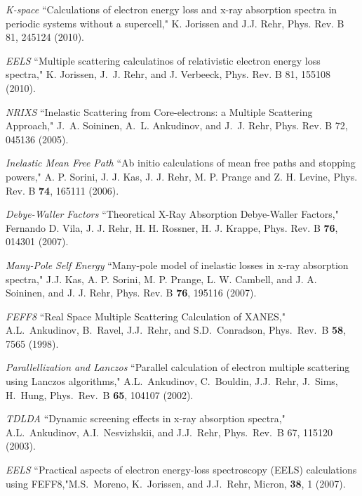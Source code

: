 \documentclass[11pt,oneside]{report} %
\begin{document}
\begin{latexonly}
\begin{Reflist}
\item [\textit{K-space}]  ``Calculations of electron energy loss and x-ray absorption spectra in periodic systems without
a supercell," K. Jorissen and J.J. Rehr, Phys. Rev. B 81, 245124 (2010).

\item [\textit{EELS}] ``Multiple scattering calculatinos of relativistic electron
energy loss spectra," K. Jorissen, J.~J. Rehr, and J. Verbeeck,
 Phys. Rev. B 81, 155108 (2010).

\item [\textit{NRIXS}] ``Inelastic Scattering from Core-electrons: a Multiple Scattering
Approach," J.~A. Soininen, A.~L. Ankudinov, and J.~J. Rehr,
Phys. Rev. B 72, 045136 (2005).

\item [\textit{Inelastic Mean Free Path}]  ``Ab initio calculations of mean free paths and stopping powers,"
A. P. Sorini, J. J. Kas, J. J. Rehr, M. P. Prange and Z. H. Levine,
Phys. Rev. B {\bf 74}, 165111 (2006).

\item [\textit{Debye-Waller Factors}] ``Theoretical X-Ray Absorption Debye-Waller Factors,"
Fernando D. Vila, J. J. Rehr, H. H. Rossner, H. J. Krappe,
Phys. Rev. B {\bf76}, 014301 (2007).

\item [\textit{Many-Pole Self Energy}]  ``Many-pole model of inelastic losses in x-ray absorption spectra,"
J.J. Kas, A. P. Sorini, M. P. Prange, L. W. Cambell, and J. A. Soininen,
and J. J. Rehr, Phys. Rev. B {\bf 76}, 195116 (2007).

\item [\textit{FEFF8}]  ``Real Space Multiple Scattering
    Calculation of XANES," A.L.\ Ankudinov, B.\ Ravel,
  J.J.\ Rehr, and S.D.\ Conradson, Phys.\ Rev.\ B \textbf{58}, 7565 (1998).

\item [\textit{Parallellization and Lanczos}] ``Parallel calculation of electron multiple scattering 
   using Lanczos algorithms," A.L.\ Ankudinov, C.\ Bouldin, J.J.\ Rehr, J.\ Sims, H.\ Hung,
    Phys.\ Rev.\ B \textbf{65}, 104107 (2002).
 
\item [\textit{TDLDA}] ``Dynamic screening effects in x-ray absorption spectra," A.L.\ Ankudinov, A.I.\ Nesvizhskii, and J.J.\ Rehr,
Phys.\ Rev.\ B 67, 115120 (2003). 

\item [\textit{EELS}] ``Practical aspects of
electron energy-loss spectroscopy (EELS) calculations using FEFF8,"M.S.\ Moreno, K.\ Jorissen, and J.J.\ Rehr, 
Micron, {\bf38}, 1 (2007).
 

\end{Reflist}
\end{latexonly}
\end{document}
